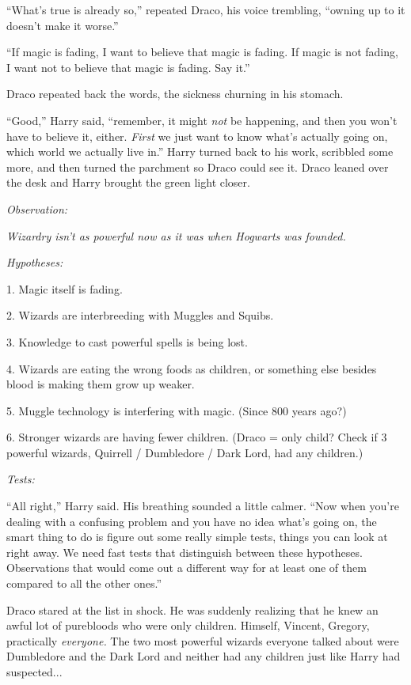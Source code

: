 ``What's true is already so,'' repeated Draco, his voice trembling, ``owning up to it doesn't make it worse.''

``If magic is fading, I want to believe that magic is fading. If magic is not fading, I want not to believe that magic is fading. Say it.''

Draco repeated back the words, the sickness churning in his stomach.

``Good,'' Harry said, ``remember, it might \emph{not} be happening, and then you won't have to believe it, either. \emph{First} we just want to know what's actually going on, which world we actually live in.'' Harry turned back to his work, scribbled some more, and then turned the parchment so Draco could see it. Draco leaned over the desk and Harry brought the green light closer.

\emph{Observation:}

\emph{Wizardry isn't as powerful now as it was when Hogwarts was founded.}

\emph{Hypotheses:}

1. Magic itself is fading.

2. Wizards are interbreeding with Muggles and Squibs.

3. Knowledge to cast powerful spells is being lost.

4. Wizards are eating the wrong foods as children, or something else besides blood is making them grow up weaker.

5. Muggle technology is interfering with magic. (Since 800 years ago?)

6. Stronger wizards are having fewer children. (Draco = only child? Check if 3 powerful wizards, Quirrell / Dumbledore / Dark Lord, had any children.)

\emph{Tests:}

``All right,'' Harry said. His breathing sounded a little calmer. ``Now when you're dealing with a confusing problem and you have no idea what's going on, the smart thing to do is figure out some really simple tests, things you can look at right away. We need fast tests that distinguish between these hypotheses. Observations that would come out a different way for at least one of them compared to all the other ones.''

Draco stared at the list in shock. He was suddenly realizing that he knew an awful lot of purebloods who were only children. Himself, Vincent, Gregory, practically \emph{everyone.} The two most powerful wizards everyone talked about were Dumbledore and the Dark Lord and neither had any children just like Harry had suspected...

